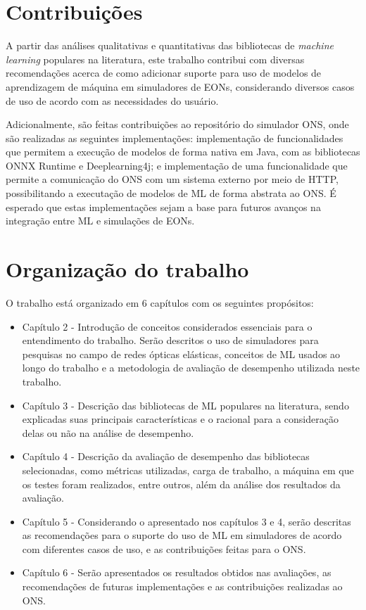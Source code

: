 \section{Contribuições}
\label{intro-contributions}

A partir das análises qualitativas e quantitativas das bibliotecas de \textit{machine learning} populares na literatura, este trabalho contribui com diversas recomendações acerca de como adicionar suporte para uso de modelos de aprendizagem de máquina em simuladores de EONs, considerando diversos casos de uso de acordo com as necessidades do usuário.

Adicionalmente, são feitas contribuições ao repositório do simulador ONS, onde são realizadas as seguintes implementações: implementação de funcionalidades que permitem a execução de modelos de forma nativa em Java, com as bibliotecas ONNX Runtime e Deeplearning4j; e implementação de uma funcionalidade que permite a comunicação do ONS com um sistema externo por meio de HTTP, possibilitando a executação de modelos de ML de forma abstrata ao ONS. É esperado que estas implementações sejam a base para futuros avanços na integração entre ML e simulações de EONs.

\section{Organização do trabalho}
\label{intro-org}

O trabalho está organizado em 6 capítulos com os seguintes propósitos:

\begin{itemize}
  \item Capítulo 2 - Introdução de conceitos considerados essenciais para o entendimento do trabalho. Serão descritos o uso de simuladores para pesquisas no campo de redes ópticas elásticas, conceitos de ML usados ao longo do trabalho e a metodologia de avaliação de desempenho utilizada neste trabalho.

  \item Capítulo 3 - Descrição das bibliotecas de ML populares na literatura, sendo explicadas suas principais características e o racional para a consideração delas ou não na análise de desempenho.

  \item Capítulo 4 - Descrição da avaliação de desempenho das bibliotecas selecionadas, como métricas utilizadas, carga de trabalho, a máquina em que os testes foram realizados, entre outros, além da análise dos resultados da avaliação.

  \item Capítulo 5 - Considerando o apresentado nos capítulos 3 e 4, serão descritas as recomendações para o suporte do uso de ML em simuladores de acordo com diferentes casos de uso, e as contribuições feitas para o \acrfull{ONS}.

  \item Capítulo 6 - Serão apresentados os resultados obtidos nas avaliações, as recomendações de futuras implementações e as contribuições realizadas ao \acrfull{ONS}.
\end{itemize}
